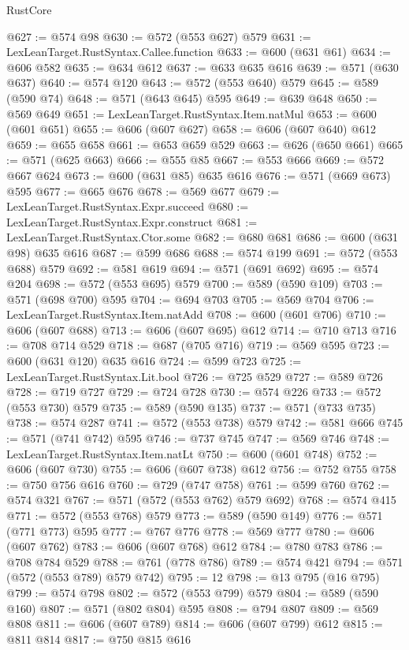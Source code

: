 \begin{lexlean}{RustCore}
\begin{coremodule}
@627 := @574 @98
@630 := @572 (@553 @627) @579
@631 := LexLeanTarget.RustSyntax.Callee.function
@633 := @600 (@631 @61)
@634 := @606 @582
@635 := @634 @612
@637 := @633 @635 @616
@639 := @571 (@630 @637)
@640 := @574 @120
@643 := @572 (@553 @640) @579
@645 := @589 (@590 @74)
@648 := @571 (@643 @645) @595
@649 := @639 @648
@650 := @569 @649
@651 := LexLeanTarget.RustSyntax.Item.natMul
@653 := @600 (@601 @651)
@655 := @606 (@607 @627)
@658 := @606 (@607 @640) @612
@659 := @655 @658
@661 := @653 @659 @529
@663 := @626 (@650 @661)
@665 := @571 (@625 @663)
@666 := @555 @85
@667 := @553 @666
@669 := @572 @667 @624
@673 := @600 (@631 @85) @635 @616
@676 := @571 (@669 @673) @595
@677 := @665 @676
@678 := @569 @677
@679 := LexLeanTarget.RustSyntax.Expr.succeed
@680 := LexLeanTarget.RustSyntax.Expr.construct
@681 := LexLeanTarget.RustSyntax.Ctor.some
@682 := @680 @681
@686 := @600 (@631 @98) @635 @616
@687 := @599 @686
@688 := @574 @199
@691 := @572 (@553 @688) @579
@692 := @581 @619
@694 := @571 (@691 @692)
@695 := @574 @204
@698 := @572 (@553 @695) @579
@700 := @589 (@590 @109)
@703 := @571 (@698 @700) @595
@704 := @694 @703
@705 := @569 @704
@706 := LexLeanTarget.RustSyntax.Item.natAdd
@708 := @600 (@601 @706)
@710 := @606 (@607 @688)
@713 := @606 (@607 @695) @612
@714 := @710 @713
@716 := @708 @714 @529
@718 := @687 (@705 @716)
@719 := @569 @595
@723 := @600 (@631 @120) @635 @616
@724 := @599 @723
@725 := LexLeanTarget.RustSyntax.Lit.bool
@726 := @725 @529
@727 := @589 @726
@728 := @719 @727
@729 := @724 @728
@730 := @574 @226
@733 := @572 (@553 @730) @579
@735 := @589 (@590 @135)
@737 := @571 (@733 @735)
@738 := @574 @287
@741 := @572 (@553 @738) @579
@742 := @581 @666
@745 := @571 (@741 @742) @595
@746 := @737 @745
@747 := @569 @746
@748 := LexLeanTarget.RustSyntax.Item.natLt
@750 := @600 (@601 @748)
@752 := @606 (@607 @730)
@755 := @606 (@607 @738) @612
@756 := @752 @755
@758 := @750 @756 @616
@760 := @729 (@747 @758)
@761 := @599 @760
@762 := @574 @321
@767 := @571 (@572 (@553 @762) @579 @692)
@768 := @574 @415
@771 := @572 (@553 @768) @579
@773 := @589 (@590 @149)
@776 := @571 (@771 @773) @595
@777 := @767 @776
@778 := @569 @777
@780 := @606 (@607 @762)
@783 := @606 (@607 @768) @612
@784 := @780 @783
@786 := @708 @784 @529
@788 := @761 (@778 @786)
@789 := @574 @421
@794 := @571 (@572 (@553 @789) @579 @742)
@795 := 12
@798 := @13 @795 (@16 @795)
@799 := @574 @798
@802 := @572 (@553 @799) @579
@804 := @589 (@590 @160)
@807 := @571 (@802 @804) @595
@808 := @794 @807
@809 := @569 @808
@811 := @606 (@607 @789)
@814 := @606 (@607 @799) @612
@815 := @811 @814
@817 := @750 @815 @616

\end{coremodule}
\end{lexlean}
